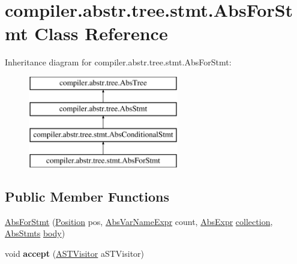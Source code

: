 \hypertarget{classcompiler_1_1abstr_1_1tree_1_1stmt_1_1_abs_for_stmt}{}\section{compiler.\+abstr.\+tree.\+stmt.\+Abs\+For\+Stmt Class Reference}
\label{classcompiler_1_1abstr_1_1tree_1_1stmt_1_1_abs_for_stmt}
Inheritance diagram for compiler.\+abstr.\+tree.\+stmt.\+Abs\+For\+Stmt\+:\begin{figure}[H]
\begin{center}
\leavevmode
\includegraphics[height=4.000000cm]{classcompiler_1_1abstr_1_1tree_1_1stmt_1_1_abs_for_stmt}
\end{center}
\end{figure}
\subsection*{Public Member Functions}
\begin{DoxyCompactItemize}
\item 
\hyperlink{classcompiler_1_1abstr_1_1tree_1_1stmt_1_1_abs_for_stmt_a0a52924276f516888867543319ed037a}{Abs\+For\+Stmt} (\hyperlink{classcompiler_1_1_position}{Position} pos, \hyperlink{classcompiler_1_1abstr_1_1tree_1_1expr_1_1_abs_var_name_expr}{Abs\+Var\+Name\+Expr} count, \hyperlink{classcompiler_1_1abstr_1_1tree_1_1expr_1_1_abs_expr}{Abs\+Expr} \hyperlink{classcompiler_1_1abstr_1_1tree_1_1stmt_1_1_abs_for_stmt_a6c0ef8f42c7d6a2d739814a133452210}{collection}, \hyperlink{classcompiler_1_1abstr_1_1tree_1_1_abs_stmts}{Abs\+Stmts} \hyperlink{classcompiler_1_1abstr_1_1tree_1_1stmt_1_1_abs_for_stmt_a228fc9e4d2dd55f25818aeca387bd43b}{body})
\item 
\mbox{\label{classcompiler_1_1abstr_1_1tree_1_1stmt_1_1_abs_for_stmt_a1a6a882a214af763f1b27cab7feba5d5}} 
void {\bfseries accept} (\hyperlink{interfacecompiler_1_1abstr_1_1_a_s_t_visitor}{A\+S\+T\+Visitor} a\+S\+T\+Visitor)
\end{DoxyCompactItemize}
